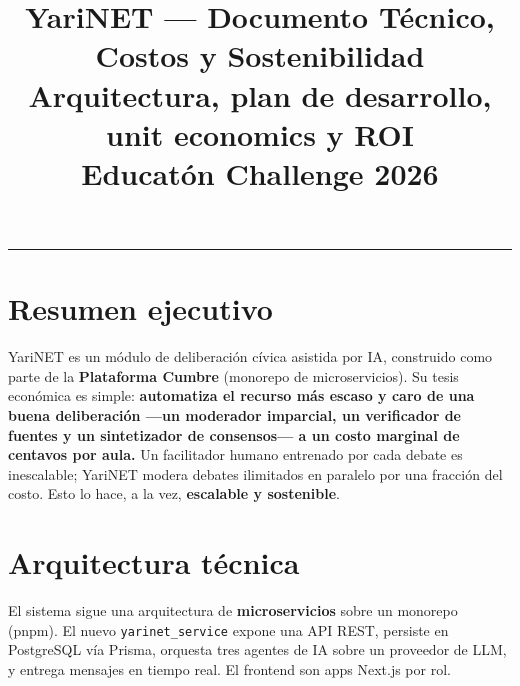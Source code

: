 \documentclass[11pt,a4paper]{article}
\title{\textbf{YariNET --- Documento T\'ecnico, Costos y Sostenibilidad}\\[2pt]
\large Arquitectura, plan de desarrollo, unit economics y ROI\\
Educat\'on Challenge 2026}
\author{}
\date{}
\begin{document}
\maketitle
\vspace{-1.2cm}
\begin{center}\rule{\textwidth}{0.4pt}\end{center}

\section{Resumen ejecutivo}
YariNET es un m\'odulo de deliberaci\'on c\'ivica asistida por IA, construido como parte de la \textbf{Plataforma Cumbre} (monorepo de microservicios). Su tesis econ\'omica es simple: \textbf{automatiza el recurso m\'as escaso y caro de una buena deliberaci\'on ---un moderador imparcial, un verificador de fuentes y un sintetizador de consensos--- a un costo marginal de centavos por aula.} Un facilitador humano entrenado por cada debate es inescalable; YariNET modera debates ilimitados en paralelo por una fracci\'on del costo. Esto lo hace, a la vez, \textbf{escalable y sostenible}.

\section{Arquitectura t\'ecnica}

El sistema sigue una arquitectura de \textbf{microservicios} sobre un monorepo (pnpm). El nuevo \texttt{yarinet\_service} expone una API REST, persiste en PostgreSQL v\'ia Prisma, orquesta tres agentes de IA sobre un proveedor de LLM, y entrega mensajes en tiempo real. El frontend son apps Next.js por rol.
\end{document}
